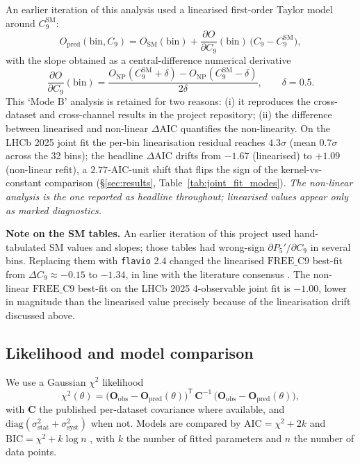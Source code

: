 An earlier iteration of this analysis used a linearised first-order
Taylor model around $C_{9}^{\mathrm{SM}}$:
\begin{equation}\label{eq:modeB}
O_{\mathrm{pred}}(\mathrm{bin}, C_{9})
  = O_{\mathrm{SM}}(\mathrm{bin})
  + \frac{\partial O}{\partial C_{9}}(\mathrm{bin})\,
    \bigl(C_{9} - C_{9}^{\mathrm{SM}}\bigr),
\end{equation}
with the slope obtained as a central-difference numerical derivative
\begin{equation}
\frac{\partial O}{\partial C_{9}}(\mathrm{bin}) =
  \frac{O_{\mathrm{NP}}(C_{9}^{\mathrm{SM}}+\delta) -
        O_{\mathrm{NP}}(C_{9}^{\mathrm{SM}}-\delta)}{2\delta},
\qquad \delta = 0.5.
\end{equation}
This `Mode B' analysis is retained for two reasons: (i) it
reproduces the cross-dataset and cross-channel results in the
project repository;
(ii) the difference between linearised and non-linear $\Delta\mathrm{AIC}$
quantifies the non-linearity. On the LHCb 2025 joint fit the per-bin
linearisation residual reaches $4.3\sigma$ (mean $0.7\sigma$ across
the 32 bins); the headline
$\Delta\mathrm{AIC}$ drifts from $-1.67$ (linearised) to $+1.09$
(non-linear refit), a $2.77$-AIC-unit shift that flips the sign of
the kernel-vs-constant comparison
(\S\ref{sec:results}, Table~\ref{tab:joint_fit_modes}).
\emph{The non-linear analysis is the one reported as headline
throughout; linearised values appear only as marked
diagnostics.}

\textbf{Note on the SM tables.} An earlier iteration of this project
used hand-tabulated SM values and slopes; those tables had wrong-sign
$\partial P_{5}'/\partial C_{9}$ in several bins. Replacing them with
\texttt{flavio} 2.4 changed the linearised
$\mathrm{FREE\_C9}$ best-fit from $\Delta C_{9}\approx -0.15$ to
$-1.34$, in line with the literature consensus
\citep{AltmannshoferStraub2013}. The non-linear $\mathrm{FREE\_C9}$
best-fit on the LHCb 2025 4-observable joint fit is $-1.00$, lower
in magnitude than the linearised value precisely because of the
linearisation drift discussed above.

\subsection{Likelihood and model comparison}

We use a Gaussian $\chi^{2}$ likelihood
\begin{equation}\label{eq:chi2}
\chi^{2}(\theta) = \bigl(\mathbf{O}_{\mathrm{obs}} -
   \mathbf{O}_{\mathrm{pred}}(\theta)\bigr)^{\mathsf T}\,
   \mathbf{C}^{-1}\, \bigl(\mathbf{O}_{\mathrm{obs}} -
   \mathbf{O}_{\mathrm{pred}}(\theta)\bigr),
\end{equation}
with $\mathbf{C}$ the published per-dataset covariance where available,
and $\mathrm{diag}(\sigma_{\mathrm{stat}}^{2}+\sigma_{\mathrm{syst}}^{2})$
when not. Models are compared by
$\mathrm{AIC}=\chi^{2}+2k$ \citep{Akaike1974} and
$\mathrm{BIC}=\chi^{2}+k\log n$ \citep{Schwarz1978BIC}, with $k$ the
number of fitted parameters and $n$ the number of data points.

